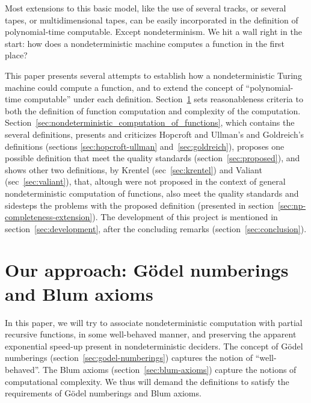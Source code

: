 \documentclass[12pt]{article}
\theoremstyle{definition}
\begin{document}
Most extensions to this basic model,
like the use of several tracks, or several tapes, or multidimensional tapes,
can be easily incorporated in the definition of polynomial-time computable.
Except nondeterminism.
We hit a wall right in the start:
how does a nondeterministic machine computes a function in the first place?

This paper presents several attempts to establish
how a nondeterministic Turing machine could compute a function,
and to extend the concept of ``polynomial-time computable'' under each definition.
Section~\ref{sec:our-approach} sets reasonableness criteria
to both the definition of function computation and complexity of the computation.
Section~\ref{sec:nondeterministic_computation_of_functions},
which contains the several definitions,
presents and criticizes Hopcroft and Ullman's and Goldreich's definitions
(sections \ref{sec:hopcroft-ullman} and~\ref{sec:goldreich}),
proposes one possible definition that meet the quality standards
(section~\ref{sec:proposed}),
and shows other two definitions,
by Krentel (sec~\ref{sec:krentel}) and Valiant (sec~\ref{sec:valiant}),
that, altough were not proposed in the context
of general nondeterministic computation of functions,
also meet the quality standards and sidesteps the problems with the proposed definition
(presented in section~\ref{sec:np-completeness-extension}).
The development of this project is mentioned in section~\ref{sec:development},
after the concluding remarks (section~\ref{sec:conclusion}).

\section{Our approach: Gödel numberings and Blum axioms}
\label{sec:our-approach}

In this paper,
we will try to associate nondeterministic computation
with partial recursive functions, in some well-behaved manner,
and preserving the apparent\footnotemark{} exponential speed-up
present in nondeterministic deciders.
The concept of Gödel numberings
(section~\ref{sec:godel-numberings})
captures the notion of ``well-behaved''.
The Blum axioms
(section~\ref{sec:blum-axioms})
capture the notions of computational complexity.
We thus will demand the definitions to satisfy
the requirements of Gödel numberings and Blum axioms.
\end{document}

